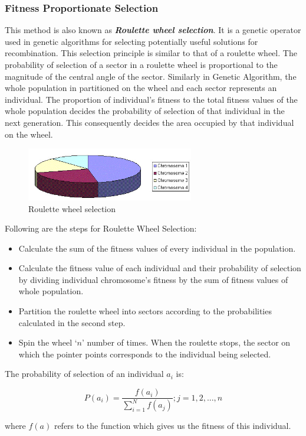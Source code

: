 \documentclass[a4paper, 12pt]{article}
\begin{document}
\subsubsection{Fitness Proportionate Selection}
This method is also known as \textbf{\textit{Roulette wheel selection}}. It is a genetic operator used in genetic algorithms for selecting potentially useful 
solutions for recombination. This selection principle is similar to that of a roulette wheel. The probability of selection of a sector in a 
roulette wheel is proportional to the magnitude of the central angle of the sector. Similarly in Genetic Algorithm, the whole population in
partitioned on the wheel and each sector represents an individual. The proportion of individual’s fitness to the total fitness values of the 
 whole population decides the probability of selection of that individual in the next generation. This consequently decides the area occupied 
by that individual on the wheel.
\begin{figure}[h]
\centering
\includegraphics[width=0.65\textwidth, clip]{./roulette.jpg}
\vspace{-0.15in}
\caption{Roulette wheel selection}
\label{fig:3}
\end{figure}
Following are the steps for Roulette Wheel Selection:
\begin{itemize}
\item Calculate the sum of the fitness values of every individual in the population.
\item Calculate the fitness value of each individual and their probability of selection by dividing individual chromosome’s fitness by the sum 
of fitness values of whole population.
\item Partition the roulette wheel into sectors according to the probabilities calculated in the second step.
\item Spin the wheel ‘$n$’ number of times. When the roulette stops, the sector on which the pointer points corresponds to the individual being selected.
\end{itemize}
The probability of selection of an individual $a_i$ is:
\begin{large}
\boldmath\begin{equation*}
P\left(a_{i}\right) = \frac{f\left(a_{i}\right)}{\sum_{i=1}^{N}f\left(a_j\right)}; j=1,2,...,n 
\end{equation*}
\end{large}
where \boldmath$f\left(a\right)$ refers to the function which gives us the fitness of this individual.
\end{document}
